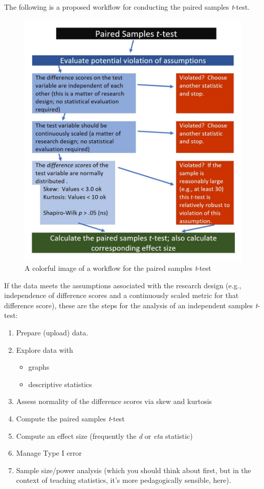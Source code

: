 \documentclass[
  11pt,
]{book}
\providecommand{\tightlist}{%
  \setlength{\itemsep}{0pt}\setlength{\parskip}{0pt}}
\begin{document}
The following is a proposed workflow for conducting the paired samples \emph{t}-test.

\begin{figure}
\centering
\includegraphics{images/ttests/PairedSampleWrkFlw.jpg}
\caption{A colorful image of a workflow for the paired samples \emph{t}-test}
\end{figure}

If the data meets the assumptions associated with the research design (e.g., independence of difference scores and a continuously scaled metric for that difference score), these are the steps for the analysis of an independent samples \emph{t}-test:

\begin{enumerate}
\def\labelenumi{\arabic{enumi}.}
\tightlist
\item
  Prepare (upload) data.
\item
  Explore data with

  \begin{itemize}
  \tightlist
  \item
    graphs
  \item
    descriptive statistics
  \end{itemize}
\item
  Assess normality of the difference scores via skew and kurtosis
\item
  Compute the paired samples \emph{t}-test
\item
  Compute an effect size (frequently the \emph{d} or \emph{eta} statistic)
\item
  Manage Type I error
\item
  Sample size/power analysis (which you should think about first, but in the context of teaching statistics, it's more pedagogically sensible, here).
\end{enumerate}
\end{document}
